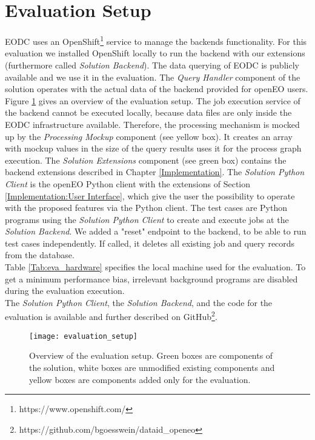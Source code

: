 \documentclass[draft,final]{vutinfth} %
\begin{document}
\section{Evaluation Setup}\label{Evaluation:Setup}

EODC uses an OpenShift\footnote{https://www.openshift.com/} service to manage the backends functionality. For this evaluation we installed OpenShift locally to run the backend with our extensions (furthermore called \textit{Solution Backend}). The data querying of EODC is publicly available and we use it in the evaluation. The \textit{Query Handler} component of the solution operates with the actual data of the backend provided for openEO users. \\
Figure \ref{fig:evaluation_setup} gives an overview of the evaluation setup. The job execution service of the backend cannot be executed locally, because data files are only inside the EODC infrastructure available. Therefore, the processing mechanism is mocked up by the \textit{Processing Mockup} component (see yellow box). It creates an array with mockup values in the size of the query results uses it for the process graph execution. The \textit{Solution Extensions} component (see green box) contains the backend extensions described in Chapter \ref{Implementation}. The \textit{Solution Python Client} is the openEO Python client with the extensions of Section \ref{Implementation:User Interface}, which give the user the possibility to operate with the proposed features via the Python client. The test cases are Python programs using the \textit{Solution Python Client} to create and execute jobs at the \textit{Solution Backend}.
We added a "reset" endpoint to the backend, to be able to run test cases independently. If called, it deletes all existing job and query records from the database. \\
Table \ref{Tab:eva_hardware} specifies the local machine used for the evaluation. To get a minimum performance bias, irrelevant background programs are disabled during the evaluation execution.\\  
The \textit{Solution Python Client}, the \textit{Solution Backend}, and the code for the evaluation is available and further described on GitHub\footnote{https://github.com/bgoesswein/dataid\_openeo}. 

\begin{figure}[h]
	\centering
	\texttt{[image: evaluation\_setup]}
	\caption{Overview of the evaluation setup. Green boxes are components of the solution, white boxes are unmodified existing components and yellow boxes are components added only for the evaluation.}
	\label{fig:evaluation_setup} %
\end{figure}
\end{document}
